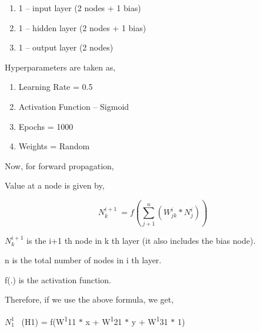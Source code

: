 \documentclass[12pt]{article}
\renewcommand{\_}{\kern-1.5pt\textunderscore\kern-1.5pt}
\begin{document}
\begin{enumerate}
	\item 1 – input layer (2 nodes + 1 bias)\par

	\item 1 – hidden layer (2 nodes + 1 bias)\par

	\item 1 – output layer (2 nodes)
\end{enumerate}\par

Hyperparameters are taken as,\par

\begin{enumerate}
	\item Learning Rate = 0.5\par

	\item Activation Function – Sigmoid \par

	\item Epochs = 1000\par

	\item Weights = Random
\end{enumerate}\par

Now, for forward propagation,\par

Value at a node is given by, \par

 \[ N_{k}^{i+1}~= f \left(  \sum _{j+1}^{n} \left( W_{jk}^{i}\ast N_{j}^{i} \right)  \right)  \] \par

 \( N_{k}^{i+1} \)  is the i+1 th node in k th layer (it also includes the bias node). \par

n is the total number of nodes in i th layer. \par

f(.) is the activation function.\par

Therefore, if we use the above formula, we get, \par

 \( N_{1}^{1} \) \  (H1) = f(W\textsuperscript{1}11 $\ast$  x + W\textsuperscript{1}21 $\ast$  y + W\textsuperscript{1}31 $\ast$  1) \par
\end{document}

